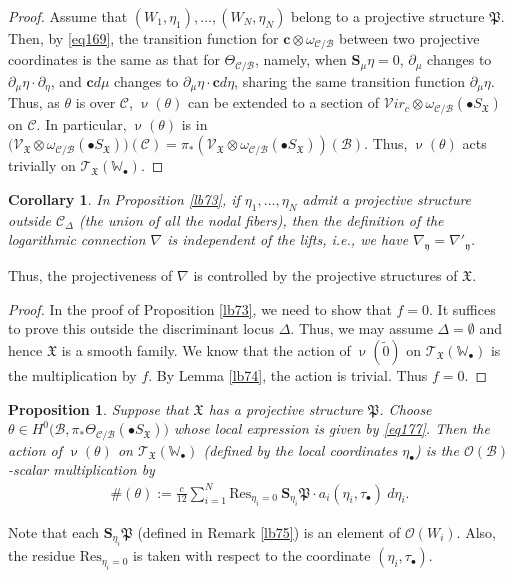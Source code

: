 \documentclass[12pt,b5paper,notitlepage]{report}
\theoremstyle{definition}
\theoremstyle{plain}
\newtheorem{pp}[df]{Proposition}
\newtheorem{co}[df]{Corollary}
\newcommand{\fk}{\mathfrak}
\newcommand{\mc}{\mathcal}
\newcommand{\wtd}{\widetilde}
\newcommand{\Res}{\mathrm{Res}}
\newcommand{\scr}{\mathscr}
\newcommand{\yk}{\mathfrak y}
\newcommand{\SX}{S_{\fk X}}
\newcommand{\blt}{\bullet}
\newcommand{\Wbb}{\mathbb W}
\newcommand{\cbf}{\mathbf c}
\newcommand{\svir}{\mathcal V\!\mathit{ir}}
\newcommand{\Sbf}{\mathbf{S}}
\numberwithin{equation}{section}
\begin{document}
\begin{proof}
Assume that $(W_1,\eta_1),\dots,(W_N,\eta_N)$ belong to a projective structure $\fk P$. Then, by \eqref{eq169}, the transition function for $\cbf \otimes \omega_{\mc C/\mc B}$  between two projective coordinates is the same as that for $\Theta_{\mc C/\mc B}$, namely, when $\Sbf_\mu\eta=0$, $\partial_\mu$ changes to $\partial_\mu\eta\cdot \partial_\eta$, and $\cbf d\mu$ changes to $\partial_\mu\eta\cdot \cbf d\eta$, sharing the same transition function $\partial_\mu\eta$. Thus, as $\theta$ is over $\mc C$, $\upnu(\theta)$ can be extended to a section of $\svir_c\otimes \omega_{\mc C/\mc B}(\blt S_{\fk X})$ on $\mc C$. In particular, $\upnu(\theta)$ is in $\big(\scr V_{\fk X}\otimes \omega_{\mc C/\mc B}(\blt \SX)\big)(\mc C)=\pi_*(\scr V_{\fk X}\otimes \omega_{\mc C/\mc B}(\blt \SX))(\mc B)$. Thus, $\upnu(\theta)$ acts trivially on $\scr T_{\fk X}(\Wbb_\blt)$.
\end{proof}



\begin{co}
In Proposition \ref{lb73},  if $\eta_1,\dots,\eta_N$ admit a projective structure outside  $\mc C_{\Delta}$ (the union of all the nodal fibers), then the definition of the logarithmic connection $\nabla$ is independent of the lifts, i.e., we have $\nabla_\yk=\nabla'_\yk$.
\end{co}

Thus, the projectiveness of $\nabla$ is controlled by the projective structures of $\fk X$.


\begin{proof}
In the proof of Proposition \ref{lb73}, we need to show that $f=0$. It suffices to prove this outside the discriminant locus $\Delta$. Thus, we may assume $\Delta=\emptyset$ and hence $\fk X$ is a smooth family. We know that the action of $\upnu(\wtd 0)$ on $\scr T_{\fk X}(\Wbb_\blt)$ is the multiplication by $f$. By Lemma \ref{lb74}, the action is trivial. Thus $f=0$.
\end{proof}



\begin{pp}\label{lb80}
Suppose that $\fk X$ has a projective structure $\fk P$. Choose $\theta\in H^0\big(\mc B,\pi_*\Theta_{\mc C/\mc B}(\blt S_{\fk X})\big)$ whose local expression is given by \eqref{eq177}. Then the action of $\upnu(\theta)$ on $\scr T_{\fk X}(\Wbb_\blt)$ (defined by the local coordinates $\eta_\blt$) is the $\scr O(\mc B)$-scalar multiplication  by
\begin{align}
\#(\theta):=\frac{c}{12}\sum_{i=1}^N \Res_{\eta_i=0}~ \Sbf_{\eta_i}\fk P\cdot a_i(\eta_i,\tau_\blt)~d\eta_i.\label{eq179}
\end{align}
\end{pp}
Note that each $\Sbf_{\eta_i}\fk P$ (defined in Remark \ref{lb75}) is an element of $\scr O(W_i)$. Also, the residue $\Res_{\eta_i=0}$ is taken with respect to the coordinate $(\eta_i,\tau_\blt)$.
\end{document}
